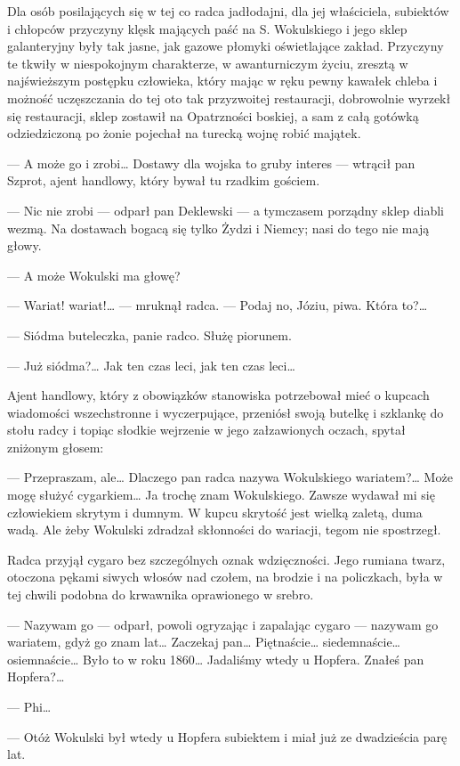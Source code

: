 \documentclass{book}
\begin{document}
Dla osób posilających się w tej co radca jadłodajni, dla jej właściciela, subiektów i chłopców przyczyny klęsk mających paść na S. Wokulskiego i jego sklep galanteryjny były tak jasne, jak gazowe płomyki oświetlające zakład. Przyczyny te tkwiły w niespokojnym charakterze, w awanturniczym życiu, zresztą w najświeższym postępku człowieka, który mając w ręku pewny kawałek chleba i możność uczęszczania do tej oto tak przyzwoitej restauracji, dobrowolnie wyrzekł się restauracji, sklep zostawił na Opatrzności boskiej, a sam z całą gotówką odziedziczoną po żonie pojechał na turecką wojnę robić majątek.

— A może go i zrobi… Dostawy dla wojska to gruby interes — wtrącił pan Szprot, ajent handlowy, który bywał tu rzadkim gościem.

— Nic nie zrobi — odparł pan Deklewski — a tymczasem porządny sklep diabli wezmą. Na dostawach bogacą się tylko Żydzi i Niemcy; nasi do tego nie mają głowy.

— A może Wokulski ma głowę?

— Wariat! wariat!… — mruknął radca. — Podaj no, Józiu, piwa. Która to?…

— Siódma buteleczka, panie radco. Służę piorunem.

— Już siódma?… Jak ten czas leci, jak ten czas leci…

Ajent handlowy, który z obowiązków stanowiska potrzebował mieć o kupcach wiadomości wszechstronne i wyczerpujące, przeniósł swoją butelkę i szklankę do stołu radcy i topiąc słodkie wejrzenie w jego załzawionych oczach, spytał zniżonym głosem:

— Przepraszam, ale… Dlaczego pan radca nazywa Wokulskiego wariatem?… Może mogę służyć cygarkiem… Ja trochę znam Wokulskiego. Zawsze wydawał mi się człowiekiem skrytym i dumnym. W kupcu skrytość jest wielką zaletą, duma wadą. Ale żeby Wokulski zdradzał skłonności do wariacji, tegom nie spostrzegł.

Radca przyjął cygaro bez szczególnych oznak wdzięczności. Jego rumiana twarz, otoczona pękami siwych włosów nad czołem, na brodzie i na policzkach, była w tej chwili podobna do krwawnika oprawionego w srebro.

— Nazywam go — odparł, powoli ogryzając i zapalając cygaro — nazywam go wariatem, gdyż go znam lat… Zaczekaj pan… Piętnaście… siedemnaście… osiemnaście… Było to w roku 1860… Jadaliśmy wtedy u Hopfera. Znałeś pan Hopfera?…


— Phi…

— Otóż Wokulski był wtedy u Hopfera subiektem i miał już ze dwadzieścia parę lat.
\end{document}
